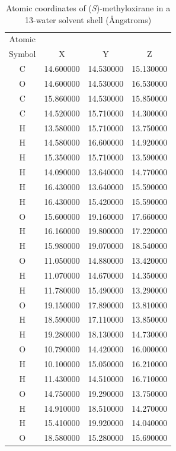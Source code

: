 \clearpage
\renewcommand*{\arraystretch}{.5}
\begin{longtable}{ c c c c }
    \caption{Atomic coordinates of (\textit{S})-methyloxirane in a 13-water solvent shell (\AA ngstroms)} \\
    \hline 
    \hline 
    Atomic & & & \\
    Symbol & X & Y & Z \\
    \hline
	C &  14.600000 &  14.530000 &  15.130000 \\
	O &  14.600000 &  14.530000 &  16.530000 \\
	C &  15.860000 &  14.530000 &  15.850000 \\
	C &  14.520000 &  15.710000 &  14.300000 \\
	H &  13.580000 &  15.710000 &  13.750000 \\
	H &  14.580000 &  16.600000 &  14.920000 \\
	H &  15.350000 &  15.710000 &  13.590000 \\
	H &  14.090000 &  13.640000 &  14.770000 \\
	H &  16.430000 &  13.640000 &  15.590000 \\
	H &  16.430000 &  15.420000 &  15.590000 \\
	O &  15.600000 &  19.160000 &  17.660000 \\
	H &  16.160000 &  19.800000 &  17.220000 \\
	H &  15.980000 &  19.070000 &  18.540000 \\
	O &  11.050000 &  14.880000 &  13.420000 \\
	H &  11.070000 &  14.670000 &  14.350000 \\
	H &  11.780000 &  15.490000 &  13.290000 \\
	O &  19.150000 &  17.890000 &  13.810000 \\
	H &  18.590000 &  17.110000 &  13.850000 \\
	H &  19.280000 &  18.130000 &  14.730000 \\
	O &  10.790000 &  14.420000 &  16.000000 \\
	H &  10.100000 &  15.050000 &  16.210000 \\
	H &  11.430000 &  14.510000 &  16.710000 \\
	O &  14.750000 &  19.290000 &  13.750000 \\
	H &  14.910000 &  18.510000 &  14.270000 \\
	H &  15.410000 &  19.920000 &  14.040000 \\
	O &  18.580000 &  15.280000 &  15.690000 \\

\end{longtable}

